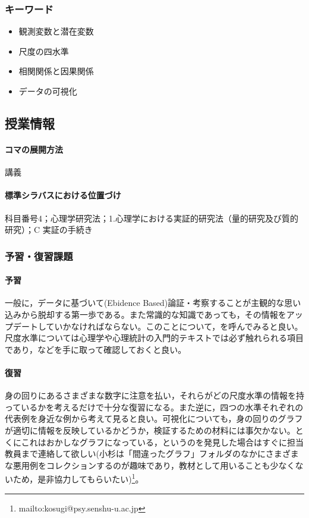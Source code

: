 \subsubsection{キーワード}
\begin{itemize}
	\item 観測変数と潜在変数
	\item 尺度の四水準
	\item 相関関係と因果関係
	\item データの可視化
\end{itemize}
\subsection{授業情報}
\paragraph{コマの展開方法}
講義
\paragraph{標準シラバスにおける位置づけ}
科目番号4；心理学研究法；1.心理学における実証的研究法（量的研究及び質的研究）；C 実証の手続き
\subsubsection{予習・復習課題}
\paragraph{予習}
一般に，データに基づいて(Ebidence Based)論証・考察することが主観的な思い込みから脱却する第一歩である。また常識的な知識であっても，その情報をアップデートしていかなければならない。このことについて，\citet{Rosling2019}を呼んでみると良い。尺度水準については心理学や心理統計の入門的テキストでは必ず触れられる項目であり，\citet{Miura201705,Kawabata201408,Yamada2004,kosugi2018,kosugi2019}などを手に取って確認しておくと良い。
\paragraph{復習}
身の回りにあるさまざまな数字に注意を払い，それらがどの尺度水準の情報を持っているかを考えるだけで十分な復習になる。また逆に，四つの水準それぞれの代表例を身近な例から考えて見ると良い。可視化についても，身の回りのグラフが適切に情報を反映しているかどうか，検証するための材料には事欠かない。とくにこれはおかしなグラフになっている，というのを発見した場合はすぐに担当教員まで連絡して欲しい(小杉は「間違ったグラフ」フォルダのなかにさまざまな悪用例をコレクションするのが趣味であり，教材として用いることも少なくないため，是非協力してもらいたい)\footnote{mailto:kosugi@psy.senshu-u.ac.jp}。
